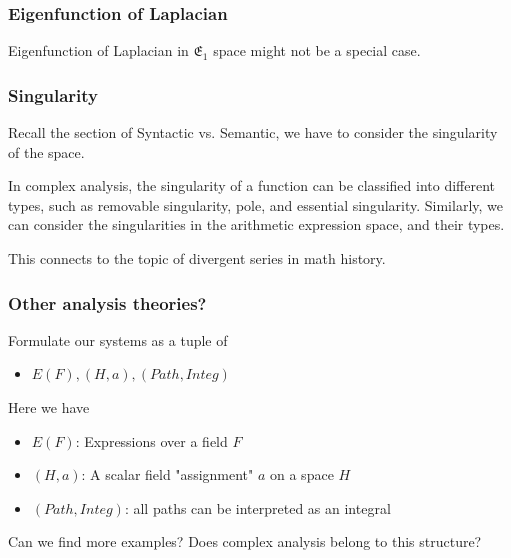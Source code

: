 \documentclass[aspectratio=169]{beamer}
\begin{document}
\begin{frame}
\frametitle{Eigenfunction of Laplacian}
    Eigenfunction of Laplacian in $\mathfrak{E_1}$ space might not be a special case.
\end{frame}

\begin{frame}
    \frametitle{Singularity}
    Recall the section of Syntactic vs. Semantic, we have to consider the singularity of the space.

    In complex analysis, the singularity of a function can be classified into different types, such as removable singularity, pole, and essential singularity.
    Similarly, we can consider the singularities in the arithmetic expression space, and their types.

    This connects to the topic of divergent series in math history.
\end{frame}

\begin{frame}
    \frametitle{Other analysis theories?}
    Formulate our systems as a tuple of
    \begin{itemize}
        \item $E(F), (H, a), (Path, Integ)$
    \end{itemize}
    Here we have
    \begin{itemize}
        \item $E(F)$: Expressions over a field $F$
        \item $(H, a)$: A scalar field "assignment" $a$ on a space $H$
        \item $(Path, Integ)$: all paths can be interpreted as an integral
    \end{itemize}
    Can we find more examples? Does complex analysis belong to this structure?
\end{frame}
\end{document}

